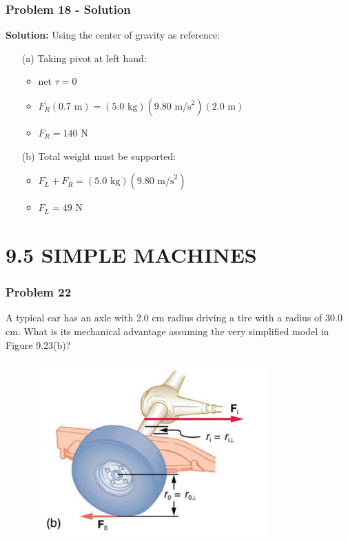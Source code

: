 \documentclass{beamer}
\begin{document}
\begin{frame}
\frametitle{Problem 18 - Solution}
\textbf{Solution:}
Using the center of gravity as reference:
\begin{itemize}
    \item[(a)] Taking pivot at left hand:
    \begin{itemize}
        \item net $\tau = 0$
        \item $F_R(0.7 \text{ m}) = (5.0 \text{ kg})(9.80 \text{ m/s}^2)(2.0 \text{ m})$
        \item $F_R = 140 \text{ N}$
    \end{itemize}
    \item[(b)] Total weight must be supported:
    \begin{itemize}
        \item $F_L + F_R = (5.0 \text{ kg})(9.80 \text{ m/s}^2)$
        \item $F_L = 49 \text{ N}$
    \end{itemize}
\end{itemize}
\end{frame}

\section{9.5 SIMPLE MACHINES}

\begin{frame}
\frametitle{Problem 22}
A typical car has an axle with 2.0 cm radius driving a tire with a radius of 30.0 cm. What is its mechanical advantage assuming the very simplified model in Figure 9.23(b)?
\begin{figure}[H]
    \centering
    \includegraphics[width=0.7\linewidth]{Screenshot 2024-11-04 122444.png}
\end{figure}

\end{frame}
\end{document}
